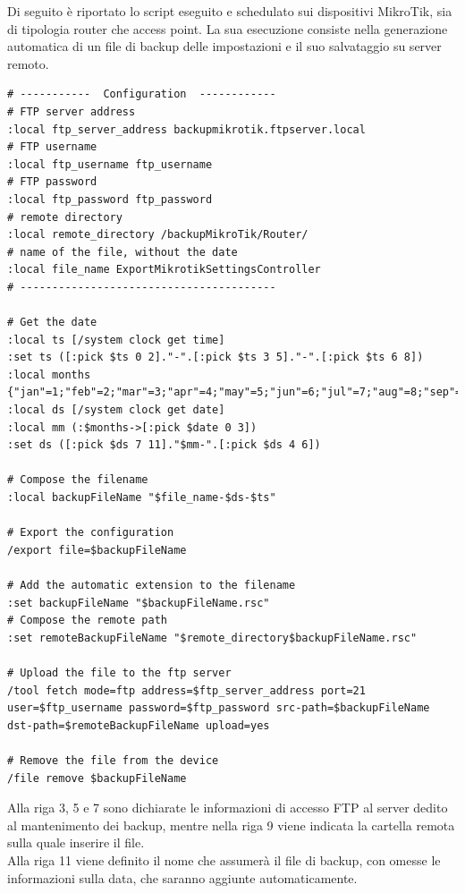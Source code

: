 \documentclass[Tesi.tex]{subfiles}
\begin{document}
Di seguito è riportato lo script eseguito e schedulato sui dispositivi MikroTik, sia di tipologia router che access point. La sua esecuzione consiste nella generazione automatica di un file di backup delle impostazioni e il suo salvataggio su server  remoto.

\begin{lstlisting}[caption=Script per il backup dei device MikroTik]
# -----------  Configuration  ------------
# FTP server address
:local ftp_server_address backupmikrotik.ftpserver.local
# FTP username
:local ftp_username ftp_username
# FTP password
:local ftp_password ftp_password
# remote directory
:local remote_directory /backupMikroTik/Router/
# name of the file, without the date
:local file_name ExportMikrotikSettingsController
# ----------------------------------------	

# Get the date
:local ts [/system clock get time]
:set ts ([:pick $ts 0 2]."-".[:pick $ts 3 5]."-".[:pick $ts 6 8])
:local months {"jan"=1;"feb"=2;"mar"=3;"apr"=4;"may"=5;"jun"=6;"jul"=7;"aug"=8;"sep"=9;"oct"=10;"nov"=11;"dec"=12}
:local ds [/system clock get date]
:local mm (:$months->[:pick $date 0 3])
:set ds ([:pick $ds 7 11]."$mm-".[:pick $ds 4 6])

# Compose the filename
:local backupFileName "$file_name-$ds-$ts"

# Export the configuration
/export file=$backupFileName

# Add the automatic extension to the filename
:set backupFileName "$backupFileName.rsc"
# Compose the remote path
:set remoteBackupFileName "$remote_directory$backupFileName.rsc"

# Upload the file to the ftp server
/tool fetch mode=ftp address=$ftp_server_address port=21 user=$ftp_username password=$ftp_password src-path=$backupFileName dst-path=$remoteBackupFileName upload=yes

# Remove the file from the device
/file remove $backupFileName
\end{lstlisting}

Alla riga 3, 5 e 7 sono dichiarate le informazioni di accesso FTP al server dedito al mantenimento dei backup, mentre nella riga 9 viene indicata la cartella remota sulla quale inserire il file.\\
Alla riga 11 viene definito il nome che assumerà il file di backup, con omesse le informazioni sulla data, che saranno aggiunte automaticamente. \\
\end{document}
